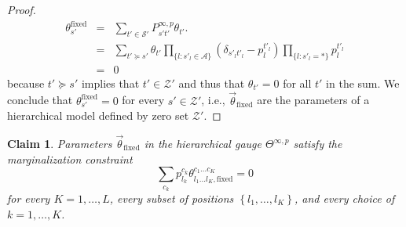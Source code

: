 \documentclass{article}
\numberwithin{myclaim}{section}
\newcommand{\set}[1]{\left\{ #1 \right\}}
\newcommand{\myfixed}{\mathrm{fixed}}
\newtheorem{claim}{Claim}
\begin{document}
\begin{proof}
\begin{eqnarray}
    \theta^\myfixed_{s'} &=& \sum_{t' \in \mathcal{S}'}  P^{\infty,p}_{s' t'} \theta_{t'}. \\
    &=&\sum_{t' \succeq s'} \theta_{t'} 
        \prod_{\{l: s'_l \in \mathcal{A}  \}}\!\! \left(\delta_{s'_l t'_l} - p^{t'_l}_l \right) 
        \prod_{\{l: s'_l = * \}}\!\! p^{t'_l}_l \label{eq:used_below}\\
        &=& 0 \label{eq:zero_sum_projection_matrix}
\end{eqnarray}
because $t' \succeq s'$ implies that $t' \in \mathcal{Z}'$ and thus that $\theta_{t'} = 0$ for all $t'$ in the sum. We conclude that $\theta^\myfixed_{s'} = 0$ for every $s' \in \mathcal{Z}'$, i.e., $\vec{\theta}_\myfixed$ are the parameters of a hierarchical model defined by zero set $\mathcal{Z}'$. 
\end{proof}

\begin{claim} \label{claim:marginalization_constraint}
Parameters $\vec{\theta}_\myfixed$ in the hierarchical gauge $\Theta^{\infty,p}$ satisfy the marginalization constraint
\begin{equation}
    \sum_{c_k} p_{l_k}^{c_k} \theta_{l_1\ldots l_K,\myfixed}^{c_1\ldots c_K} = 0
\end{equation}
for every $K=1,\ldots,L$, every subset of positions $\set{l_1,\ldots,l_K}$, and every choice of $k = 1, \ldots, K$.
\end{claim}
\end{document}
